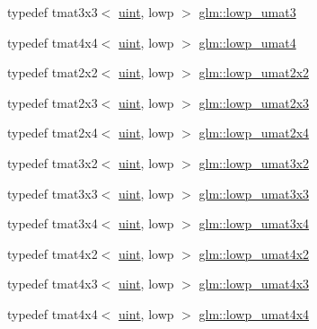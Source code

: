 \begin{DoxyCompactItemize}
\item 
typedef tmat3x3$<$ \hyperlink{stb__image_8c_a91ad9478d81a7aaf2593e8d9c3d06a14}{uint}, lowp $>$ \hyperlink{group__gtc__matrix__integer_ga71b66cc4f5e2d30b64ec99425562a6b6}{glm\+::lowp\+\_\+umat3}
\item 
typedef tmat4x4$<$ \hyperlink{stb__image_8c_a91ad9478d81a7aaf2593e8d9c3d06a14}{uint}, lowp $>$ \hyperlink{group__gtc__matrix__integer_gaa430d894a3290d551061d0d77c017cec}{glm\+::lowp\+\_\+umat4}
\item 
typedef tmat2x2$<$ \hyperlink{stb__image_8c_a91ad9478d81a7aaf2593e8d9c3d06a14}{uint}, lowp $>$ \hyperlink{group__gtc__matrix__integer_ga13b2812e9b0af47e0f498391383d145a}{glm\+::lowp\+\_\+umat2x2}
\item 
typedef tmat2x3$<$ \hyperlink{stb__image_8c_a91ad9478d81a7aaf2593e8d9c3d06a14}{uint}, lowp $>$ \hyperlink{group__gtc__matrix__integer_ga3af254ecb450000314422b1730afacc0}{glm\+::lowp\+\_\+umat2x3}
\item 
typedef tmat2x4$<$ \hyperlink{stb__image_8c_a91ad9478d81a7aaf2593e8d9c3d06a14}{uint}, lowp $>$ \hyperlink{group__gtc__matrix__integer_gad5e8f08c103d5dd33767e31938357aa6}{glm\+::lowp\+\_\+umat2x4}
\item 
typedef tmat3x2$<$ \hyperlink{stb__image_8c_a91ad9478d81a7aaf2593e8d9c3d06a14}{uint}, lowp $>$ \hyperlink{group__gtc__matrix__integer_ga3ea8482ddaa10befe8dc2d681d86bb59}{glm\+::lowp\+\_\+umat3x2}
\item 
typedef tmat3x3$<$ \hyperlink{stb__image_8c_a91ad9478d81a7aaf2593e8d9c3d06a14}{uint}, lowp $>$ \hyperlink{group__gtc__matrix__integer_gab27a50de8b11ec09b2f5cf1cf4c1a062}{glm\+::lowp\+\_\+umat3x3}
\item 
typedef tmat3x4$<$ \hyperlink{stb__image_8c_a91ad9478d81a7aaf2593e8d9c3d06a14}{uint}, lowp $>$ \hyperlink{group__gtc__matrix__integer_ga2ed807c71afb8c0f8742bb03e9f71829}{glm\+::lowp\+\_\+umat3x4}
\item 
typedef tmat4x2$<$ \hyperlink{stb__image_8c_a91ad9478d81a7aaf2593e8d9c3d06a14}{uint}, lowp $>$ \hyperlink{group__gtc__matrix__integer_ga5f4e6bb892b20b532bd9caa9aee120b9}{glm\+::lowp\+\_\+umat4x2}
\item 
typedef tmat4x3$<$ \hyperlink{stb__image_8c_a91ad9478d81a7aaf2593e8d9c3d06a14}{uint}, lowp $>$ \hyperlink{group__gtc__matrix__integer_gae94cb13770f09d0a086e6fb627f47b84}{glm\+::lowp\+\_\+umat4x3}
\item 
typedef tmat4x4$<$ \hyperlink{stb__image_8c_a91ad9478d81a7aaf2593e8d9c3d06a14}{uint}, lowp $>$ \hyperlink{group__gtc__matrix__integer_ga6ec13ea43b4328e29219f8515c188997}{glm\+::lowp\+\_\+umat4x4}

\end{DoxyCompactItemize}
